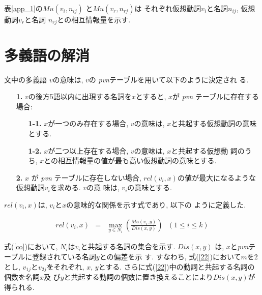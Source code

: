 \noindent
表\ref{app_1}の$Mu(v_{i}, n_{ij})$ と$Mu(v_{r},n_{rj})$は 
それぞれ仮想動詞$v_{i}$と名詞$n_{ij}$, 仮想動詞$v_{r}$と名詞
$n_{rj}$との相互情報量を示す.


\section{多義語の解消}

文中の多義語 $v$の意味は, $v$の {\it pvn}テーブルを用いて以下のように決定され
る.

\begin{enumerate}
\item[\bf 1.] $v$の後方5語以内に出現する名詞を$x$とすると, $x$が{\it 
pvn} テーブルに存在する場合:

\begin{enumerate}
\item[\bf 1-1.] $x$が一つのみ存在する場合, $v$の意味は, $x$と共起する仮想動詞の意味
とする.

\item[\bf 1-2.] $x$が二つ以上存在する場合, $v$の意味は, $x$と共起する仮想動
詞のうち, $x$との相互情報量の値が最も高い仮想動詞の意味とする.

\end{enumerate}

\item[\bf 2.] $x$ が {\it pvn} テーブルに存在しない場合,
$rel(v_{i},x)$の値が最大になるような仮想動詞$v_{i}$を求める.  $v$の意
味は, $v_{i}$の意味とする.
\end{enumerate}

\noindent
$rel(v_{i},x)$は, $v_{i}$と$x$の意味的な関係を示す式であり, 以下の
ように定義した.

\begin{eqnarray}
rel(v_{i},x) & = & \max_{y \in N_{i}}(\frac{Mu(v_{i},y)}{Dis(x,y)}) \ \ \ (1 \leq
i \leq k) \label{co}
\end{eqnarray}

\noindent
式(\ref{co})において, $N_{i}$は$v_{i}$と共起する名詞の集合を示す.  $Dis(x,y)$ は, $x$と{\it pvn}テーブルに登録されている名詞$y$\hspace{-0.05mm}との偏差を示
す. すなわち, \hspace{-0.1mm}式(\ref{22})\hspace{-0.1mm}において$m$を2とし, $v_{1j}$と$v_{2j}$をそれぞれ,
$x$\hspace{-0.05mm}, $y$\hspace{-0.05mm}とする. さらに式(\ref{22})\hspace{-0.1mm}中の動詞と共起する名詞の個数を名詞$x$\hspace{-0.05mm}及
び$y$\hspace{-0.05mm}と共起する動詞の個数に置き換えることにより$Dis(x,y)$が得られる.  

